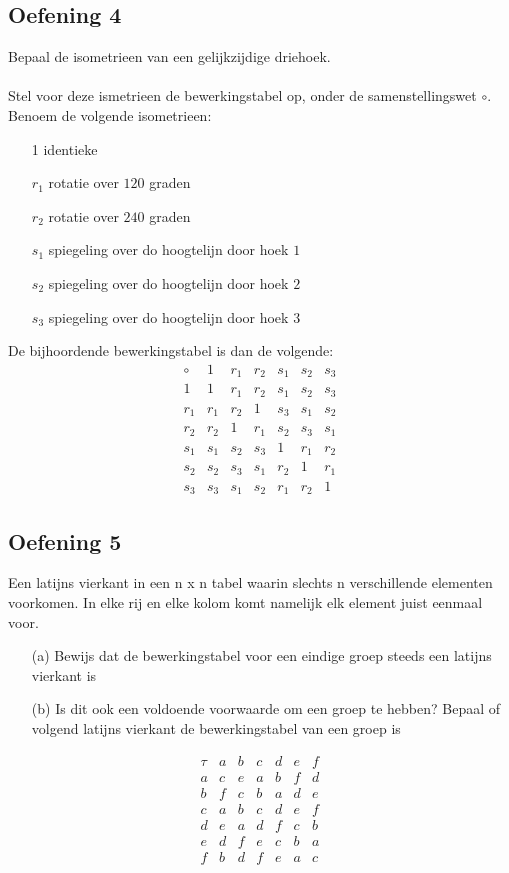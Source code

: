 \documentclass[main.tex]{subfiles}
\begin{document}
\subsection*{Oefening 4}
Bepaal de isometrieen van een gelijkzijdige driehoek.\\\\
Stel voor deze ismetrieen de bewerkingstabel op, onder de samenstellingswet $\circ$.
Benoem de volgende isometrieen:
\begin{itemize}
\item[1]
identieke
\item[$r_1$]
rotatie over $120$ graden
\item[$r_2$]
rotatie over $240$ graden
\item[$s_1$]
spiegeling over do hoogtelijn door hoek $1$
\item[$s_2$]
spiegeling over do hoogtelijn door hoek $2$
\item[$s_3$]
spiegeling over do hoogtelijn door hoek $3$
\end{itemize}
\[
\]
De bijhoordende bewerkingstabel is dan de volgende:
\[
\begin{array}{c|ccccccc}
  \circ& 1     &  r_1  &  r_2  &  s_1  &  s_2  &  s_3 \\
  \hline
  1    & 1     &  r_1  &  r_2  &  s_1  &  s_2  &  s_3 \\
  r_1  &  r_1  &  r_2  &  1    &  s_3  &  s_1  &  s_2 \\
  r_2  &  r_2  &  1    &  r_1  &  s_2  &  s_3  &  s_1 \\
  s_1  &  s_1  &  s_2  &  s_3  &  1    &  r_1  &  r_2 \\
  s_2  &  s_2  &  s_3  &  s_1  &  r_2  &  1    &  r_1 \\
  s_3  &  s_3  &  s_1  &  s_2  &  r_1  &  r_2  & 1
\end{array}
\]

\subsection*{Oefening 5}
Een latijns vierkant in een n x n tabel waarin slechts n verschillende elementen voorkomen.
In elke rij en elke kolom komt namelijk elk element juist eenmaal voor.
\begin{itemize}
\item[(a)] Bewijs dat de bewerkingstabel voor een eindige groep steeds een latijns vierkant is
\item[(b)] Is dit ook een voldoende voorwaarde om een groep te hebben? Bepaal of volgend latijns vierkant de bewerkingstabel van een groep is
\end{itemize} 
\[ 
\begin{array}{c|cccccc}
   \tau & a & b & c & d & e & f\\
   \hline
   a & c & e & a & b & f & d\\
   b & f & c & b & a & d & e\\
   c & a & b & c & d & e & f\\
   d & e & a & d & f & c & b\\
   e & d & f & e & c & b & a\\
   f & b & d & f & e & a & c\\
\end{array}
\]
\end{document}

